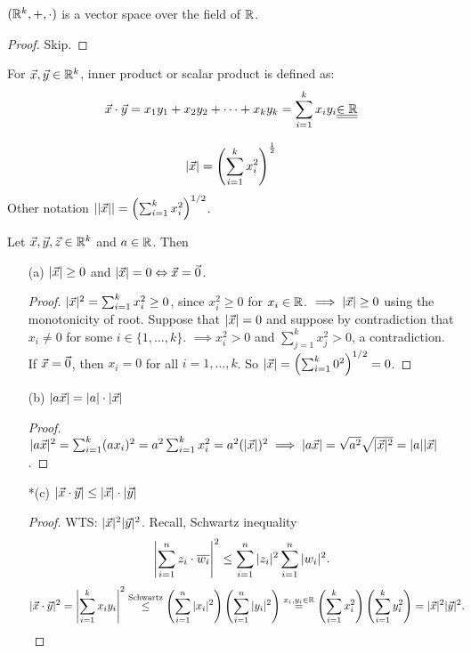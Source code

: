 \documentclass[]{article}
\begin{document}
\begin{theorem}
	$(\mathbb{R}^k,+,\cdot)$ is a vector space over the field of $\mathbb{R}$.
\end{theorem}
\begin{proof}
	Skip.
\end{proof}
\begin{definition}
	For $\vec{x},\vec{y}\in\mathbb{R}^k$, inner product or scalar product is defined as:
	$$ \vec{x}\cdot\vec{y} = x_1y_1+x_2y_2+\dots+x_ky_k = \sum_{i=1}^k x_iy_i\underline{\underline{\in\mathbb{R}}}$$
\end{definition}
\begin{definition}
	$$ |\vec{x}| = \left( \sum_{i=1}^k x_i^2 \right)^\frac{1}{2}$$
	Other notation $||\vec{x}|| = \left( \sum_{i=1}^k x_i^2 \right)^{1/2}$.
\end{definition}
\begin{theorem}
	Let $\vec{x},\vec{y},\vec{z}\in\mathbb{R}^k$ and $a\in\mathbb{R}$. Then
	\begin{enumerate}
		\item[(a)] $|\vec{x}|\geq 0$ and $|\vec{x}| = 0 \Leftrightarrow \vec{x} = \vec{0}$.
		\begin{proof}
			$|\vec{x}|^2 = \sum_{i=1}^k x_i^2 \geq 0$, since $x_i^2 \geq 0$ for $x_i\in\mathbb{R}$. $\implies |\vec{x}| \geq 0$ using the monotonicity of root. Suppose that $|\vec{x}| = 0$ and suppose by contradiction that $x_i\neq 0$ for some $i\in\{1,\dots,k\}$. $\implies x_i^2 >0$ and $\sum_{j=1}^k x_j^2 > 0$, a contradiction. If $\vec{x} = \vec{0}$, then $x_i = 0$ for all $i = 1,\dots,k$. So $|\vec{x}| = \left( \sum_{i=1}^k 0^2 \right)^{1/2} = 0$.
		\end{proof}
		\item[(b)] $|a\vec{x}| = |a|\cdot|\vec{x}|$
		\begin{proof}
			$|a\vec{x}|^2 = \sum_{i=1}^k (a x_i)^2 = a^2 \sum_{i=1}^k x_i^2 = a^2(|\vec{x}|)^2 \implies |a\vec{x}| = \sqrt{a^2}\sqrt{|\vec{x}|^2} = |a||\vec{x}|$.
		\end{proof}
		\item[*(c)] $|\vec{x}\cdot\vec{y}| \leq |\vec{x}|\cdot |\vec{y}|$
		\begin{proof}
			WTS: $|\vec{x}|^2|\vec{y}|^2$. Recall, Schwartz inequality $$\left| \sum_{i=1}^n z_i \cdot \overline{w_i} \right|^2 \leq \sum_{i=1}^n |z_i|^2 \sum_{i=1}^n |w_i|^2.$$
			\begin{align*}
				|\vx\cdot \vy|^2 &= \left| \sum_{i=1}^k x_iy_i \right|^2
				\os{\text{Schwartz}}{\leq} \left(\sum_{i=1}^n |x_i|^2 \right) \left( \sum_{i=1}^n |y_i|^2 \right) \os{x_i,y_i\in\mb R}{=} \left(\sum_{i=1}^k x_i^2 \right) \left( \sum_{i=1}^k y_i^2 \right) = |\vx|^2 |\vy|^2.

\end{align*}
\end{proof}
\end{enumerate}
\end{theorem}
\end{document}
